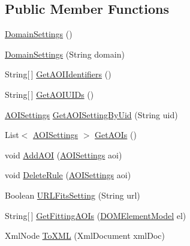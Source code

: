 \subsection*{Public Member Functions}
\begin{DoxyCompactItemize}
\item 
\hyperlink{class_web_analyzer_1_1_models_1_1_settings_model_1_1_domain_settings_a8ffad3f7b78462d687db4f95dd484953}{Domain\+Settings} ()
\item 
\hyperlink{class_web_analyzer_1_1_models_1_1_settings_model_1_1_domain_settings_af6797984cc6e12c59f276558864db719}{Domain\+Settings} (String domain)
\item 
String\mbox{[}$\,$\mbox{]} \hyperlink{class_web_analyzer_1_1_models_1_1_settings_model_1_1_domain_settings_a7ff89407de4e9ea34dc9535194dc3ca5}{Get\+A\+O\+I\+Identifiers} ()
\item 
String\mbox{[}$\,$\mbox{]} \hyperlink{class_web_analyzer_1_1_models_1_1_settings_model_1_1_domain_settings_a29e5b2dc3e3a0476dc5822615a949e21}{Get\+A\+O\+I\+U\+I\+Ds} ()
\item 
\hyperlink{class_web_analyzer_1_1_models_1_1_settings_model_1_1_a_o_i_settings}{A\+O\+I\+Settings} \hyperlink{class_web_analyzer_1_1_models_1_1_settings_model_1_1_domain_settings_a5cd076f8ac19ba306443c66ea0a032a7}{Get\+A\+O\+I\+Setting\+By\+Uid} (String uid)
\item 
List$<$ \hyperlink{class_web_analyzer_1_1_models_1_1_settings_model_1_1_a_o_i_settings}{A\+O\+I\+Settings} $>$ \hyperlink{class_web_analyzer_1_1_models_1_1_settings_model_1_1_domain_settings_ab1d25299b3a24bad81acc44b1994f342}{Get\+A\+O\+Is} ()
\item 
void \hyperlink{class_web_analyzer_1_1_models_1_1_settings_model_1_1_domain_settings_a339c77553bc0005a04e1f054f78d4e16}{Add\+A\+O\+I} (\hyperlink{class_web_analyzer_1_1_models_1_1_settings_model_1_1_a_o_i_settings}{A\+O\+I\+Settings} aoi)
\item 
void \hyperlink{class_web_analyzer_1_1_models_1_1_settings_model_1_1_domain_settings_ab2f91f58d7deeaabda24138cb92999e9}{Delete\+Rule} (\hyperlink{class_web_analyzer_1_1_models_1_1_settings_model_1_1_a_o_i_settings}{A\+O\+I\+Settings} aoi)
\item 
Boolean \hyperlink{class_web_analyzer_1_1_models_1_1_settings_model_1_1_domain_settings_a19cfec6016d0dbfe5a3b5a73efca93df}{U\+R\+L\+Fits\+Setting} (String url)
\item 
String\mbox{[}$\,$\mbox{]} \hyperlink{class_web_analyzer_1_1_models_1_1_settings_model_1_1_domain_settings_af25051da84e5c45e90ae3425963ed800}{Get\+Fitting\+A\+O\+Is} (\hyperlink{class_web_analyzer_1_1_models_1_1_data_model_1_1_d_o_m_element_model}{D\+O\+M\+Element\+Model} el)
\item 
Xml\+Node \hyperlink{class_web_analyzer_1_1_models_1_1_settings_model_1_1_domain_settings_a493458b4a083d0aca8d573612c578e7f}{To\+X\+M\+L} (Xml\+Document xml\+Doc)
\end{DoxyCompactItemize}
